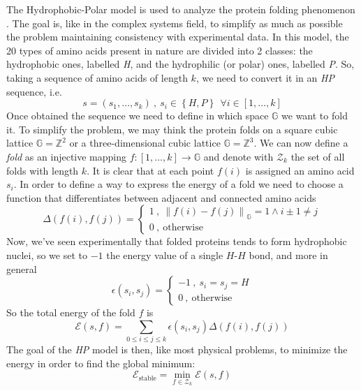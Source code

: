 The Hydrophobic-Polar model is used to analyze the protein folding phenomenon \cite{PERM}.
The goal is, like in the complex systems field, to simplify as much as possible the problem maintaining consistency with experimental data.
In this model, the 20 types of amino acids present in nature are divided into 2 classes: the hydrophobic ones, labelled \emph{H}, and the hydrophilic (or polar) ones, labelled \emph{P}.
So, taking a sequence of amino acids of length $k$, we need to convert it in an \emph{HP} sequence, i.e.
\begin{equation*}
    s = \left(s_1, \ldots, s_k\right) \ , \ s_i \in \left\{H, P\right\} \ \ \forall i \in \left[1,\ldots,k\right]
\end{equation*}
Once obtained the sequence we need to define in which space $\mathbb{G}$ we want to fold it.
To simplify the problem, we may think the protein folds on a square cubic lattice $\mathbb{G} = \mathbb{Z}^2$ or a three-dimensional cubic lattice $\mathbb{G} = \mathbb{Z}^3$.
We can now define a \emph{fold} as an injective mapping $f : \left[1,\ldots,k\right] \to \mathbb{G}$ and denote with $\mathcal{Z}_k$ the set of all folds with length $k$.
It is clear that at each point $f(i)$ is assigned an amino acid $s_i$.
In order to define a way to express the energy of a fold we need to choose a function that differentiates between adjacent and connected amino acids
\begin{equation*}
    \Delta\left(f(i),f(j)\right) =
    \begin{cases}
        1 \ , \ {\left\lVert f(i) - f(j) \right\rVert}_\mathbb{G} = 1 \land i \pm 1 \neq j\\
        0 \ , \ \text{otherwise}
    \end{cases}
\end{equation*}
Now, we've seen experimentally that folded proteins tends to form hydrophobic nuclei, so we set to $-1$ the energy value of a single $H$-$H$ bond, and more in general
\begin{equation*}
    \epsilon\left(s_i,s_j\right) =
    \begin{cases}
        -1 \ , \ s_i = s_j = H\\
        0 \ , \ \text{otherwise}
    \end{cases}
\end{equation*}
So the total energy of the fold $f$ is
\begin{equation*}
    \mathcal{E}(s,f) = \sum_{0 \leq i \leq j \leq k} \epsilon\left(s_i,s_j\right)\Delta\left(f(i),f(j)\right)
\end{equation*}
The goal of the \emph{HP} model is then, like most physical problems, to minimize the energy in order to find the global minimum:
\begin{equation*}
    \mathcal{E}_\text{stable} = \min_{f \in \mathcal{Z}_k} \mathcal{E}(s,f)
\end{equation*}
